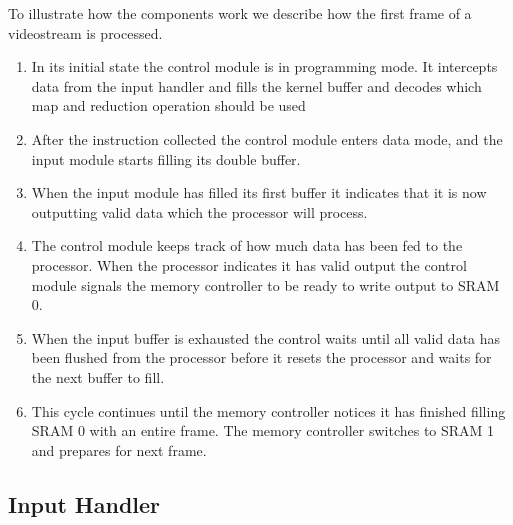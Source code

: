 To illustrate how the components work we describe how the first frame of a videostream is processed.
\begin{enumerate}

    \item In its initial state the control module is in programming mode. It intercepts data from the input handler and fills the kernel buffer and decodes which map and reduction operation should be used
    \item After the instruction collected the control module enters data mode, and the input module starts filling its double buffer.
    \item When the input module has filled its first buffer it indicates that it is now outputting valid data which the processor will process.
    \item The control module keeps track of how much data has been fed to the processor. When the processor indicates it has valid output the control module signals the memory controller to be ready to write output to SRAM 0.
    \item When the input buffer is exhausted the control waits until all valid data has been flushed from the processor before it resets the processor and waits for the next buffer to fill.
    \item This cycle continues until the memory controller notices it has finished filling SRAM 0 with an entire frame. The memory controller switches to SRAM 1 and prepares for next frame.
\end{enumerate}

\subsection{Input Handler}


